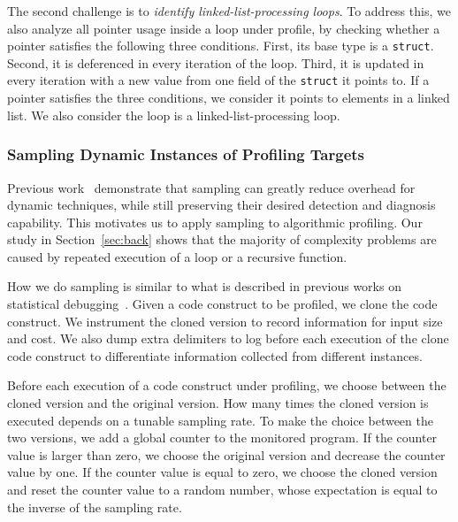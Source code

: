 The second challenge is to \emph{identify linked-list-processing loops}.
To address this, we also analyze all pointer usage inside a loop under profile, 
by checking whether a pointer satisfies the following three conditions.
First, its base type is a \texttt{struct}.
Second, it is deferenced in every iteration of the loop.
Third, it is updated in every iteration with a new value 
from one field of the \texttt{struct} it points to.
If a pointer satisfies the three conditions, 
we consider it points to elements in a linked list.
We also consider the loop is a linked-list-processing loop. 



\subsubsection{Sampling Dynamic Instances of Profiling Targets}


Previous work~\cite{liblit03,liblit05,CCI,SongOOPSLA2014,ldoctor}
demonstrate that sampling can greatly 
reduce overhead for dynamic techniques,
while still preserving their desired 
detection and diagnosis capability. 
This motivates us to apply sampling to algorithmic profiling. 
Our study in Section~\ref{sec:back} shows that 
the majority of complexity problems are caused by repeated execution of a loop
or a recursive function. 

How we do sampling is similar to what is described in previous works 
on statistical debugging~\cite{liblit03,liblit05,CCI,SongOOPSLA2014,ldoctor}.
Given a code construct to be profiled, 
we clone the code construct.
We instrument the cloned version to record information for input size and cost.
We also dump extra delimiters to log before each 
execution of the clone code construct
to differentiate information collected from different instances. 

Before each execution of a code construct under profiling, 
we choose between the cloned version and the original version. 
How many times the cloned version is executed 
depends on a tunable sampling rate. 
To make the choice between the two versions,
we add a global counter to the monitored program. 
If the counter value is larger than zero, 
we choose the original version and decrease the counter value by one.
If the counter value is equal to zero,
we choose the cloned version and reset the counter value to 
a random number, 
whose expectation is 
equal to the inverse of the sampling rate.  


